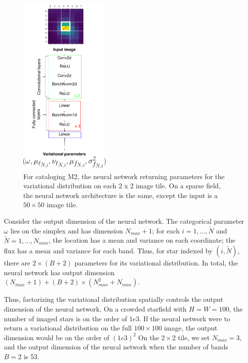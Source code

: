 \begin{figure}[!h]
    \centering
    \includegraphics[width=0.4\textwidth]{figures/starnet_archetecture2.png}
    \vspace{-0.5cm}
    \caption{For cataloging M2, the neural network returning parameters for the variational distribution on each 2 x 2 image tile.
    On a sparse field, the neural network architecture is the same, 
    except the input is a $50 \times 50$ image tile. }
    \label{fig:starnet_arch}
\end{figure}

Consider the output dimension of the neural network. The categorical parameter $\omega$ lies on the 
simplex and has dimension $N_{max} + 1$; for each $i = 1, ..., \tilde N$ and $\tilde N = 1, ..., N_{max}$, the location has a mean and variance on each coordinate; the flux has a mean and variance for each band. Thus, for star indexed by $(i, \tilde N)$, 
there are $2 \times (B + 2)$ parameters for its variational distribution. In total, the neural network has output dimension $(N_{max} + 1) + (B + 2) \times (N_{max}^2 + N_{max})$. 


Thus, factorizing the variational distribution spatially controls the output dimension of the neural network. On a crowded starfield with $H = W = 100$, the number of imaged stars is on the order of $1e3$. If the neural network were to return a variational distribution on the full $100\times 100$ image, the output dimension would be on the order of $(1e3)^2$
On the $2\times 2$ tile, we set $N_{max} = 3$, and the output dimension of the neural network when the number of bands $B = 2$ is 
53. 

